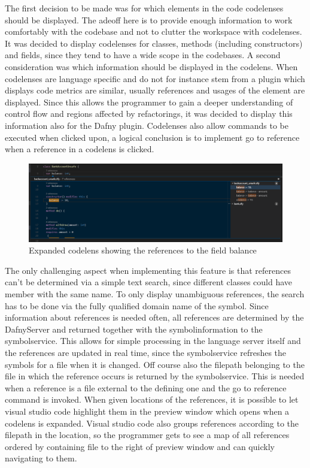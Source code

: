 The first decision to be made was for which elements in the code codelenses should be displayed. The adeoff here is to  provide enough information to work comfortably with the codebase and not to clutter the workspace with codelenses. It was decided to display codelenses for classes, methods (including constructors) and fields, since they tend to have a wide scope in the codebases. \newline
A second consideration was which information should be displayed in the codelens. When codelenses are language specific and do not for instance stem from a plugin which displays code metrics are similar, usually references and usages of the element are displayed. Since this allows the programmer to gain a deeper understanding of control flow and regions affected by refactorings, it was decided to display this information also for the Dafny plugin. Codelenses also allow commands to be executed when clicked upon, a logical conclusion is to implement go to reference when a reference in a codelens is clicked.\newline

\begin{figure}[H]
	\centering
	\includegraphics[width=1\textwidth]{img/codelensesExpanded}
	\caption{Expanded codelens showing the references to the field balance}
	\label{fig:codelensesexpanded}
\end{figure}

The only challenging aspect when implementing this feature is that references can't be determined via a simple text search, since different classes could have member with the same name. To only display unambiguous references, the search has to be done via the fully qualified domain name of the symbol. Since information about references is needed often, all references are determined by the DafnyServer and returned together with the symbolinformation to the symbolservice. This allows for simple processing in the language server itself and the references are updated in real time, since the symbolservice refreshes the symbols for a file when it is changed. Off course also the filepath belonging to the file in which the reference occurs is returned by the symbolservice. This is needed when a reference is a file external to the defining one and the go to reference command is invoked.\newline
When given locations of the references, it is possible to let visual studio code highlight them in the preview window which opens when a codelens is expanded. Visual studio code also groups references according to the filepath in the location, so the programmer gets to see a map of all references ordered by containing file to the right of preview window and can quickly navigating to them.

